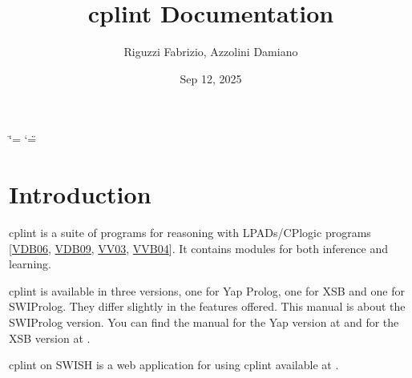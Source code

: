 \documentclass[letterpaper,10pt,english]{sphinxmanual}
\title{cplint Documentation}
\date{Sep 12, 2025}
\author{Riguzzi Fabrizio, Azzolini Damiano}
\begin{document}
\ifdefined\shorthandoff
  \ifnum\catcode`\=\string=\active\shorthandoff{=}\fi
  \ifnum\catcode`\"=\active{}\fi
\fi

\pagestyle{empty}
\sphinxmaketitle
\pagestyle{plain}
\sphinxtableofcontents
\pagestyle{normal}
\label{\detokenize{index::doc}}



\chapter{Introduction}
\label{\detokenize{index:introduction}}
\sphinxAtStartPar
cplint is a suite of programs for reasoning with LPADs/CP\sphinxhyphen{}logic programs {[}\hyperlink{cite.index:id67}{VDB06}, \hyperlink{cite.index:id68}{VDB09}, \hyperlink{cite.index:id66}{VV03}, \hyperlink{cite.index:id46}{VVB04}{]}.
It contains modules for both inference and learning.

\sphinxAtStartPar
cplint is available in three versions, one for Yap Prolog, one for XSB and one for SWI\sphinxhyphen{}Prolog.
They differ slightly in the features offered.
This manual is about the SWI\sphinxhyphen{}Prolog version.
You can find the manual for the Yap version at  and
for the XSB version at .

\sphinxAtStartPar
cplint on SWISH is a web application for using cplint available at .
\end{document}
